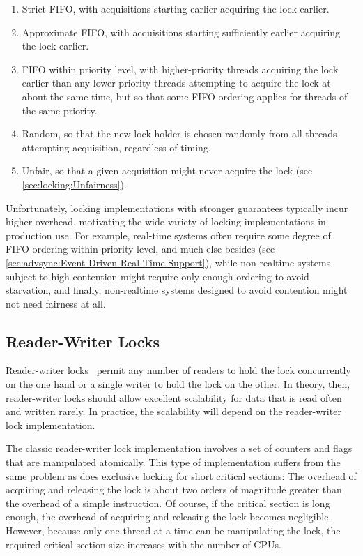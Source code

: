 \begin{enumerate}
\item	Strict FIFO, with acquisitions starting earlier acquiring
	the lock earlier.
\item	Approximate FIFO, with acquisitions starting sufficiently
	earlier acquiring the lock earlier.
\item	FIFO within priority level, with higher-priority threads
	acquiring the lock earlier than any lower-priority threads
	attempting to acquire the lock at about the same time, but so
	that some FIFO ordering applies for threads of the same priority.
\item	Random, so that the new lock holder is chosen randomly from
	all threads attempting acquisition, regardless of timing.
\item	
	Unfair, so that a given acquisition might never acquire the lock
	(see \cref{sec:locking:Unfairness}).
\end{enumerate}

Unfortunately, locking implementations with stronger guarantees
typically incur higher overhead, motivating the wide variety of locking
implementations in production use.
For example, real-time systems often require some degree of FIFO
ordering within priority level, and much else besides
(see \cref{sec:advsync:Event-Driven Real-Time Support}),
while non-realtime systems subject to high contention might require
only enough ordering to avoid starvation, and finally, non-realtime
systems designed to avoid contention might not need fairness at all.

\subsection{Reader-Writer Locks}
\label{sec:locking:Reader-Writer Locks}

Reader-writer locks~\cite{Courtois71}
permit any number of readers to hold the lock
concurrently on the one hand or a single writer to hold the lock
on the other.
In theory, then, reader-writer locks should allow excellent scalability
for data that is read often and written rarely.
In practice, the scalability will depend on the reader-writer lock
implementation.

The classic reader-writer lock implementation involves a set of
counters and flags that are manipulated atomically.
This type of implementation suffers from the same problem as does
exclusive locking for short critical sections: The overhead of acquiring
and releasing the lock
is about two orders of magnitude greater than the overhead
of a simple instruction.
Of course, if the critical section is long enough, the overhead of
acquiring and releasing the lock becomes negligible.
However, because only
one thread at a time can be manipulating the lock, the required
critical-section size increases with the number of CPUs.

